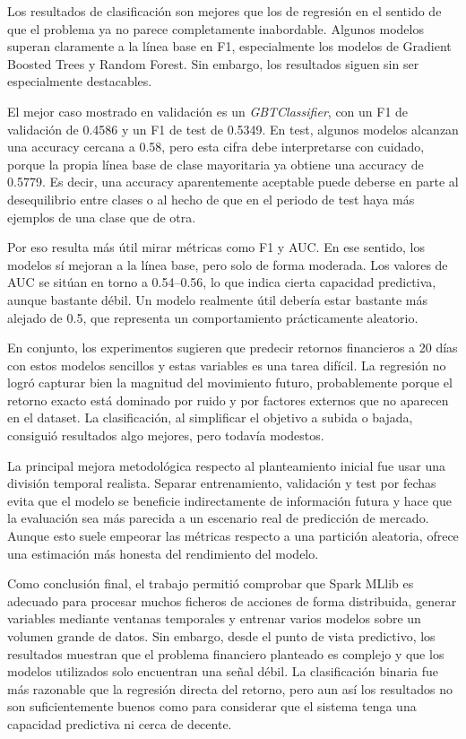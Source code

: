 \documentclass[runningheads]{llncs}
\begin{document}
Los resultados de clasificación son mejores que los de regresión en el sentido de que el problema ya no parece completamente inabordable. Algunos modelos superan claramente a la línea base en F1, especialmente los modelos de Gradient Boosted Trees y Random Forest. Sin embargo, los resultados siguen sin ser especialmente destacables.

El mejor caso mostrado en validación es un \textit{GBTClassifier}, con un F1 de validación de 0.4586 y un F1 de test de 0.5349. En test, algunos modelos alcanzan una accuracy cercana a 0.58, pero esta cifra debe interpretarse con cuidado, porque la propia línea base de clase mayoritaria ya obtiene una accuracy de 0.5779. Es decir, una accuracy aparentemente aceptable puede deberse en parte al desequilibrio entre clases o al hecho de que en el periodo de test haya más ejemplos de una clase que de otra.

Por eso resulta más útil mirar métricas como F1 y AUC. En ese sentido, los modelos sí mejoran a la línea base, pero solo de forma moderada. Los valores de AUC se sitúan en torno a 0.54--0.56, lo que indica cierta capacidad predictiva, aunque bastante débil. Un modelo realmente útil debería estar bastante más alejado de 0.5, que representa un comportamiento prácticamente aleatorio.

En conjunto, los experimentos sugieren que predecir retornos financieros a 20 días con estos modelos sencillos y estas variables es una tarea difícil. La regresión no logró capturar bien la magnitud del movimiento futuro, probablemente porque el retorno exacto está dominado por ruido y por factores externos que no aparecen en el dataset. La clasificación, al simplificar el objetivo a subida o bajada, consiguió resultados algo mejores, pero todavía modestos.

La principal mejora metodológica respecto al planteamiento inicial fue usar una división temporal realista. Separar entrenamiento, validación y test por fechas evita que el modelo se beneficie indirectamente de información futura y hace que la evaluación sea más parecida a un escenario real de predicción de mercado. Aunque esto suele empeorar las métricas respecto a una partición aleatoria, ofrece una estimación más honesta del rendimiento del modelo.

Como conclusión final, el trabajo permitió comprobar que Spark MLlib es adecuado para procesar muchos ficheros de acciones de forma distribuida, generar variables mediante ventanas temporales y entrenar varios modelos sobre un volumen grande de datos. Sin embargo, desde el punto de vista predictivo, los resultados muestran que el problema financiero planteado es complejo y que los modelos utilizados solo encuentran una señal débil. La clasificación binaria fue más razonable que la regresión directa del retorno, pero aun así los resultados no son suficientemente buenos como para considerar que el sistema tenga una capacidad predictiva ni cerca de decente.
\end{document}
